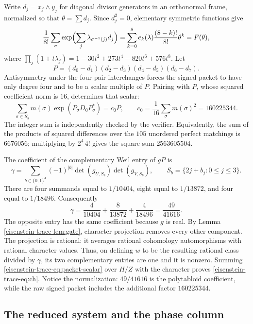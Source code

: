 \documentclass[11pt]{article}
\theoremstyle{definition}
\theoremstyle{remark}
\begin{document}
Write $d_j=x_j\wedge y_j$ for diagonal divisor generators in an
orthonormal frame, normalized so that $\theta=\sum d_j$.
Since $d_j^2=0$, elementary symmetric functions give
\[
 \frac1{8!}\sum_\sigma\exp\Bigl(\sum_j\lambda_{\sigma^{-1}(j)}d_j\Bigr)
  =\sum_{k=0}^8 e_k(\lambda)\frac{(8-k)!}{8!}\theta^k=F(\theta),
\]
where
$\prod_j(1+t\lambda_j)=1-30t^2+273t^4-820t^6+576t^8$.
Let
\[
 P=(d_0-d_1)(d_2-d_3)(d_4-d_5)(d_6-d_7).
\]
Antisymmetry under the four pair interchanges forces the signed packet
to have only degree four and to be a scalar multiple of $P$.  Pairing
with $P$, whose squared coefficient norm is $16$, determines that scalar:
\begin{equation}\label{eisenstein-trace-eq:packet-scalar}
 \sum_{\sigma\in S_8}m(\sigma)\exp(P_\sigma D_0P_\sigma^*)
 =c_0P,\qquad
 c_0=\frac1{16}\sum_\sigma m(\sigma)^2=160225344.
\end{equation}
The integer sum is independently checked by the verifier.  Equivalently,
the sum of the products of squared differences over the $105$ unordered
perfect matchings is $6676056$; multiplying by $2^4\,4!$ gives the
square sum $2563605504$.

The coefficient of the complementary Weil entry of $gP$ is
\begin{equation}\label{eisenstein-trace-eq:minor}
 \gamma=\sum_{b\in\{0,1\}^4}(-1)^{|b|}
     \det(g_{U,S_b})\det(g_{V,S_b}),\qquad
 S_b=\{2j+b_j:0\leq j\leq3\}.
\end{equation}
There are four summands equal to $1/10404$, eight equal to $1/13872$,
and four equal to $1/18496$.  Consequently
\[
 \gamma=\frac4{10404}+\frac8{13872}+\frac4{18496}
       =\frac{49}{41616}.
\]
The opposite entry has the same coefficient because $g$ is real.
By Lemma \ref{eisenstein-trace-lem:gate}, character projection removes every other
component.  The projection is rational: it averages rational
cohomology automorphisms with rational character values.  Thus, on
defining $w$ to be the resulting rational class divided by $\gamma$,
its two complementary entries are one and it is nonzero.  Summing
\eqref{eisenstein-trace-eq:packet-scalar} over $H/Z$ with the character proves
\eqref{eisenstein-trace-eq:ch}.  Notice the normalization: $49/41616$ is the
polytabloid coefficient, while the raw signed packet includes the
additional factor $160225344$.

\subsection{The reduced system and the phase column}
\end{document}
